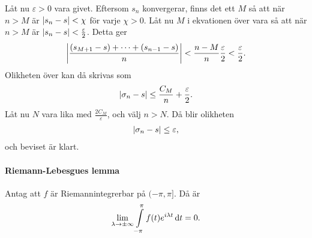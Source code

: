 Låt nu $\varepsilon > 0$ vara givet. Eftersom $s_{n}$ konvergerar, finns det ett $M$ så att när $n > M$ är $\abs{s_{n} - s} < \chi$ för varje $\chi > 0$. Låt nu $M$ i ekvationen över vara så att när $n > M$ är $\abs{s_{n} - s} < \frac{\varepsilon}{2}$. Detta ger
\begin{align*}
	\abs{\frac{(s_{M + 1} - s) + \dots + (s_{n - 1} - s)}{n}} < \frac{n - M}{n}\frac{\varepsilon}{2} < \frac{\varepsilon}{2}.
\end{align*}
Olikheten över kan då skrivas som
\begin{align*}
	\abs{\sigma_{n} - s} \leq \frac{C_{M}}{n} + \frac{\varepsilon}{2}.
\end{align*}
Låt nu $N$ vara lika med $\frac{2C_{M}}{\varepsilon}$, och välj $n > N$. Då blir olikheten
\begin{align*}
	\abs{\sigma_{n} - s} \leq \varepsilon,
\end{align*}
och beviset är klart.

\paragraph{Riemann-Lebesgues lemma}
Antag att $f$ är Riemannintegrerbar på $(-\pi, \pi]$. Då är
\begin{align*}
	\lim\limits_{\lambda\to\pm\infty}\int\limits_{-\pi}^{\pi}f(t)e^{i\lambda t}\dd{t} = 0.
\end{align*}


